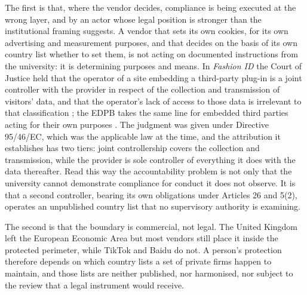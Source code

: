 \documentclass[]{interact}
\begin{document}
The first is that, where the vendor decides, compliance is being executed at the wrong layer, and by an actor whose legal position is stronger than the institutional framing suggests. A vendor that sets its own cookies, for its own advertising and measurement purposes, and that decides on the basis of its own country list whether to set them, is not acting on documented instructions from the university: it is determining purposes and means. In \emph{Fashion ID} the Court of Justice held that the operator of a site embedding a third-party plug-in is a joint controller with the provider in respect of the collection and transmission of visitors' data, and that the operator's lack of access to those data is irrelevant to that classification \citep{cjeu2019fashionid}; the EDPB takes the same line for embedded third parties acting for their own purposes \citep{edpb2021controller}. The judgment was given under Directive 95/46/EC, which was the applicable law at the time, and the attribution it establishes has two tiers: joint controllership covers the collection and transmission, while the provider is sole controller of everything it does with the data thereafter. Read this way the accountability problem is not only that the university cannot demonstrate compliance for conduct it does not observe. It is that a second controller, bearing its own obligations under Articles 26 and 5(2), operates an unpublished country list that no supervisory authority is examining.

The second is that the boundary is commercial, not legal. The United Kingdom left the European Economic Area but most vendors still place it inside the protected perimeter, while TikTok and Baidu do not. A person's protection therefore depends on which country lists a set of private firms happen to maintain, and those lists are neither published, nor harmonised, nor subject to the review that a legal instrument would receive.
\end{document}
